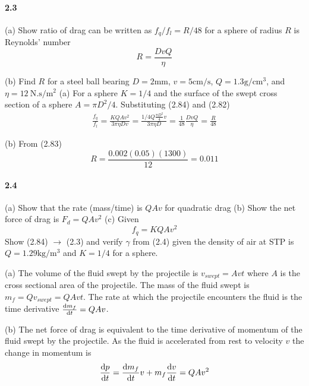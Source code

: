 \documentclass[../problems.tex]{subfiles}
\begin{document}
\paragraph{2.3}
(a) Show ratio of drag can be written as $f_q/f_l = R/48$ for a sphere of radius $R$ is Reynolds'
number
\begin{equation*}
    \tag{2.83}
    R = \frac{DvQ}{\eta}
\end{equation*}

(b) Find $R$ for a steel ball bearing $D = 2 \si{\mm}$, $ v = 5 \si{\cm\per\s}$, 
$Q = 1.3 \si{\g\per\cm^3}$, and $\eta = \qty{12}{\N.\s\per\m^2}$
\barh
(a) For a sphere $K = 1/4$ and the surface of the swept cross section of a sphere $A = \pi D^2/4$.
Substituting (2.84) and (2.82)
\begin{align*}
    \frac{f_q}{f_l} = \frac{K Q A v^2}{3\pi \eta D v} = \frac{1/4 Q \frac{\pi D^2}{4}v}{3\pi\eta D}
    = \frac{1}{48}\frac{DvQ}{\eta} = \frac{R}{48}
\end{align*}

(b) From (2.83)
\begin{equation*}
    R = \frac{0.002(0.05)(1300)}{12} = 0.011
\end{equation*}

\paragraph{2.4}
(a) Show that the rate (mass/time) is $QAv$ for quadratic drag (b) Show the net force of drag is
$F_d = QAv^2$ (c) Given
\begin{equation*}
    \tag{2.84} \label{eq2.84}
    f_q = KQAv^2 
\end{equation*}
Show (2.84) $\rightarrow$ (2.3) and verify $\gamma$ from (2.4) given the density of air at STP is
 $Q = 1.29 \si{\kg\per\m^3}$ and $K = 1/4$ for a sphere.
\barh

(a) The volume of the fluid swept by the projectile is $v_{swept} = Avt$ where $A$ is the cross
sectional area of the projectile. The mass of the fluid swept is $m_f = Qv_{swept} = QAvt$. The rate
at which the projectile encounters the fluid is the time derivative $\dv{m_f}{t} = QAv$.

(b) The net force of drag is equivalent to the time derivative of momentum of the fluid swept by the
projectile. As the fluid is accelerated from rest to velocity $v$ the change in momentum is
\begin{equation*}
    \dv{p}{t} = \dv{m_f}{t} v + m_f \dv{v}{t} = QAv^2
\end{equation*}
\end{document}
